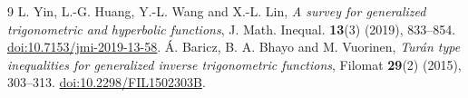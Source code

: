 \documentclass[11pt]{article}
\begin{document}
\begin{thebibliography}{9}
 L. Yin, L.-G. Huang, Y.-L. Wang and X.-L. Lin,
\emph{A survey for generalized trigonometric and hyperbolic functions},
J. Math. Inequal. \textbf{13}(3) (2019), 833--854.
\href{https://doi.org/10.7153/jmi-2019-13-58}{doi:10.7153/jmi-2019-13-58}.
 \'A. Baricz, B. A. Bhayo and M. Vuorinen,
\emph{Tur\'an type inequalities for generalized inverse trigonometric functions},
Filomat \textbf{29}(2) (2015), 303--313.
\href{https://doi.org/10.2298/FIL1502303B}{doi:10.2298/FIL1502303B}.
\end{thebibliography}
\end{document}
